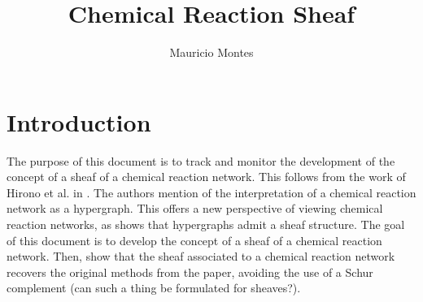 \documentclass[12pt]{article}
\author{Mauricio Montes}
\title{Chemical Reaction Sheaf}
\theoremstyle{definition}
\newcommand{\<}{\langle}
\renewcommand{\>}{\rangle}
\begin{document}
\maketitle

\section{Introduction}

The purpose of this document is to track and monitor the development of the concept of
a sheaf of a chemical reaction network. This follows from the work of Hirono et al. in 
\cite{Hirono2021}. The authors mention of the interpretation of a chemical reaction network
as a hypergraph. This offers a new perspective of viewing chemical reaction networks, as 
\cite{duta2023sheaf} shows that hypergraphs admit a sheaf structure. The goal of this document
is to develop the concept of a sheaf of a chemical reaction network. Then, show that the 
sheaf associated to a chemical reaction network recovers the original methods from the paper,
avoiding the use of a Schur complement (can such a thing be formulated for sheaves?).

\begin{comment}%

\section{Definitions}

\subsection{Topology}

\subsection{Simplicial Complexes}

\subsection{Simplicial Homology}

\subsection{Simplicial Cohomology}

\subsection{Chemical Reaction Network}

\end{comment}%
\end{document}
